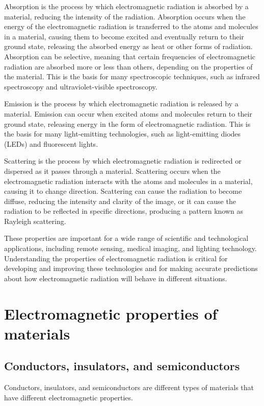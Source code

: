 \documentclass{article}
\begin{document}
Absorption is the process by which electromagnetic radiation is absorbed by a
material, reducing the intensity of the radiation. Absorption occurs when the
energy of the electromagnetic radiation is transferred to the atoms and
molecules in a material, causing them to become excited and eventually return
to their ground state, releasing the absorbed energy as heat or other forms of
radiation. Absorption can be selective, meaning that certain frequencies of
electromagnetic radiation are absorbed more or less than others, depending on
the properties of the material. This is the basis for many spectroscopic
techniques, such as infrared spectroscopy and ultraviolet-visible spectroscopy.

Emission is the process by which electromagnetic radiation is released by a
material. Emission can occur when excited atoms and molecules return to their
ground state, releasing energy in the form of electromagnetic radiation. This
is the basis for many light-emitting technologies, such as light-emitting
diodes (LEDs) and fluorescent lights.

Scattering is the process by which electromagnetic radiation is redirected or
dispersed as it passes through a material. Scattering occurs when the
electromagnetic radiation interacts with the atoms and molecules in a material,
causing it to change direction. Scattering can cause the radiation to become
diffuse, reducing the intensity and clarity of the image, or it can cause the
radiation to be reflected in specific directions, producing a pattern known as
Rayleigh scattering.

These properties are important for a wide range of scientific and technological
applications, including remote sensing, medical imaging, and lighting
technology. Understanding the properties of electromagnetic radiation is
critical for developing and improving these technologies and for making
accurate predictions about how electromagnetic radiation will behave in
different situations.

\section{Electromagnetic properties of materials} %
\label{sec:Electromagnetic properties of materials}
\subsection{Conductors, insulators, and semiconductors} %
\label{ssub:Conductors, insulators, and semiconductors}
Conductors, insulators, and semiconductors are different types of materials
that have different electromagnetic properties.
\end{document}
